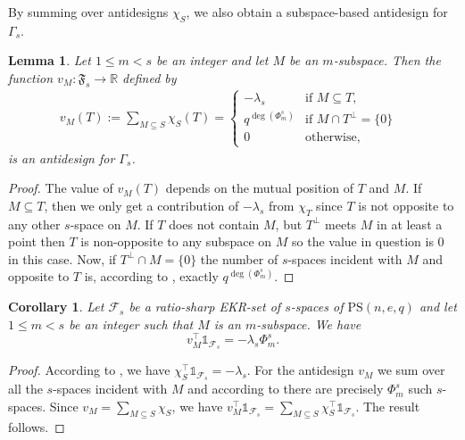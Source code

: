 \documentclass[11pt]{article}
\newtheorem{lemma}[thm]{Lemma}
\newtheorem{cor}[thm]{Corollary}
\newcommand{\allones}{\mathds{1}}
\newcommand{\EKR}{\mathcal{F}}
\newcommand{\PS}{\mathrm{PS}}
\newcommand{\cF}{\mathfrak{F}}
\renewcommand{\leq}{\leqslant}
\begin{document}
By summing over antidesigns $\chi_S$, we also obtain a subspace-based antidesign for $\Gamma_s$.

\begin{lemma} \label{L:m-spaces_m<s}
  Let $1\leq m<s$ be an integer and let $M$ be an $m$-subspace. Then the function $v_M:\cF_s\to \mathbb{R}$ defined by
\begin{align*}
v_M(T):=\sum\limits_{M \subseteq S}\chi_S(T) =\begin{cases}
-\lambda_s & \text{if $M \subseteq T$,}
\\
q^{\deg(\Phi_m^s)} &  \text{if $M \cap T^\perp =\{0\}$ } \\
0 & \text{otherwise,}
\end{cases}
\end{align*}
is an antidesign for $\Gamma_s$.
\end{lemma}

\begin{proof}
    The value of $v_M(T)$ depends on the mutual position of $T$ and $M$. If $M\subseteq T$, then we only get a contribution of $-\lambda_s$ from $\chi_T$ since $T$ is not opposite to any other $s$-space on $M$. If $T$ does not contain $M$, but $T^\perp$ meets $M$ in at least a point then $T$ is non-opposite to any subspace on $M$ so the value in question is $0$ in this case. Now, if $T^\perp\cap M=\{0\}$ the number of $s$-spaces incident with $M$ and opposite to $T$ is, according to , exactly $q^{\deg(\Phi_m^s)}$. 
\end{proof}

\begin{cor} \label{C: Intersection m-spaces m<s}
Let $\EKR_s$ be a ratio-sharp EKR-set of $s$-spaces of $\PS(n,e,q)$ and let  $1\leq m<s$ be an integer such that $M$ is an $m$-subspace. We have 
$$v_M^\top \allones_{\EKR_s} = -\lambda_s \Phi_m^s .$$
\end{cor}

\begin{proof}
    According to , we have $\chi_S^\top \allones_{\EKR_s}=-\lambda_s$. For the antidesign $v_M$ we sum over all the $s$-spaces incident with $M$ and according to  there are precisely $\Phi_m^s$ such $s$-spaces. Since $v_M=\sum\limits_{M \subseteq S}\chi_S$, we have  $v_M^\top \allones_{\EKR_s}=\sum\limits_{M \subseteq S} \chi_S^\top \allones_{\EKR_s} $. The result follows. 
\end{proof}
\end{document}
